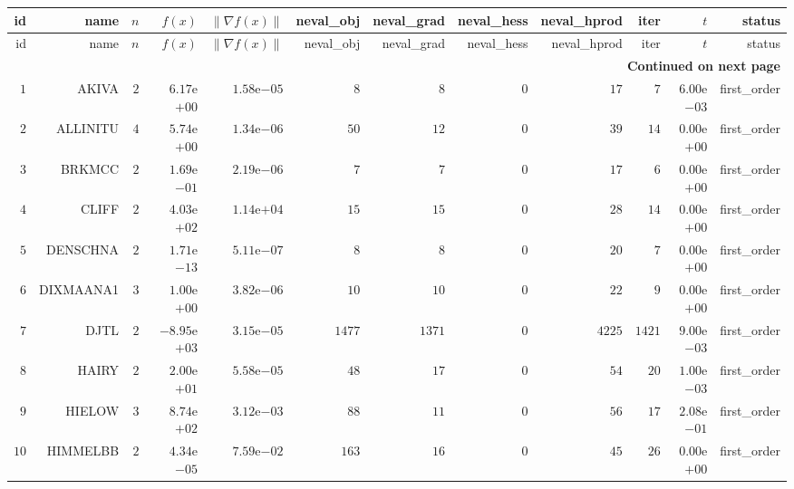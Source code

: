 \begin{longtable}{rrrrrrrrrrrr}
  \hline
  id & name & \(n\) & \(f(x)\) & \(\|\nabla f(x)\|\) & neval\_obj & neval\_grad & neval\_hess & neval\_hprod & iter & \(t\) & status \\\hline
  \endfirsthead
  \hline
  id & name & \(n\) & \(f(x)\) & \(\|\nabla f(x)\|\) & neval\_obj & neval\_grad & neval\_hess & neval\_hprod & iter & \(t\) & status \\\hline
  \endhead
  \hline
  \multicolumn{12}{r}{{\bfseries Continued on next page}}\\
  \hline
  \endfoot
  \endlastfoot
  \(     1\) & AKIVA & \(     2\) & \( 6.17\)e\(+00\) & \( 1.58\)e\(-05\) & \(     8\) & \(     8\) & \(     0\) & \(    17\) & \(     7\) & \( 6.00\)e\(-03\) & first\_order \\
  \(     2\) & ALLINITU & \(     4\) & \( 5.74\)e\(+00\) & \( 1.34\)e\(-06\) & \(    50\) & \(    12\) & \(     0\) & \(    39\) & \(    14\) & \( 0.00\)e\(+00\) & first\_order \\
  \(     3\) & BRKMCC & \(     2\) & \( 1.69\)e\(-01\) & \( 2.19\)e\(-06\) & \(     7\) & \(     7\) & \(     0\) & \(    17\) & \(     6\) & \( 0.00\)e\(+00\) & first\_order \\
  \(     4\) & CLIFF & \(     2\) & \( 4.03\)e\(+02\) & \( 1.14\)e\(+04\) & \(    15\) & \(    15\) & \(     0\) & \(    28\) & \(    14\) & \( 0.00\)e\(+00\) & first\_order \\
  \(     5\) & DENSCHNA & \(     2\) & \( 1.71\)e\(-13\) & \( 5.11\)e\(-07\) & \(     8\) & \(     8\) & \(     0\) & \(    20\) & \(     7\) & \( 0.00\)e\(+00\) & first\_order \\
  \(     6\) & DIXMAANA1 & \(     3\) & \( 1.00\)e\(+00\) & \( 3.82\)e\(-06\) & \(    10\) & \(    10\) & \(     0\) & \(    22\) & \(     9\) & \( 0.00\)e\(+00\) & first\_order \\
  \(     7\) & DJTL & \(     2\) & \(-8.95\)e\(+03\) & \( 3.15\)e\(-05\) & \(  1477\) & \(  1371\) & \(     0\) & \(  4225\) & \(  1421\) & \( 9.00\)e\(-03\) & first\_order \\
  \(     8\) & HAIRY & \(     2\) & \( 2.00\)e\(+01\) & \( 5.58\)e\(-05\) & \(    48\) & \(    17\) & \(     0\) & \(    54\) & \(    20\) & \( 1.00\)e\(-03\) & first\_order \\
  \(     9\) & HIELOW & \(     3\) & \( 8.74\)e\(+02\) & \( 3.12\)e\(-03\) & \(    88\) & \(    11\) & \(     0\) & \(    56\) & \(    17\) & \( 2.08\)e\(-01\) & first\_order \\
  \(    10\) & HIMMELBB & \(     2\) & \( 4.34\)e\(-05\) & \( 7.59\)e\(-02\) & \(   163\) & \(    16\) & \(     0\) & \(    45\) & \(    26\) & \( 0.00\)e\(+00\) & first\_order \\

\end{longtable}
